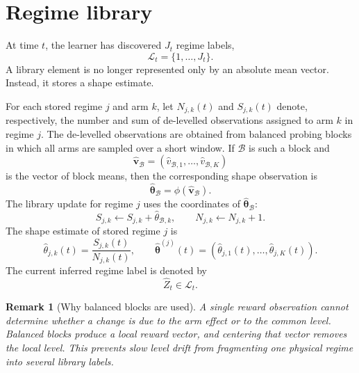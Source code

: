 \documentclass[11pt]{article}
\newtheorem{remark}{Remark}
\begin{document}
\section{Regime library}
\label{sec:regime_library}

At time $t$, the learner has discovered $J_t$ regime labels,
\begin{equation}
\label{eq:library}
\mathcal L_t=\{1,\ldots,J_t\}.
\end{equation}
A library element is no longer represented only by an absolute mean vector. Instead, it stores a shape estimate.

For each stored regime $j$ and arm $k$, let $N_{j,k}(t)$ and $S_{j,k}(t)$ denote, respectively, the number and sum of de-levelled observations assigned to arm $k$ in regime $j$. The de-levelled observations are obtained from balanced probing blocks in which all arms are sampled over a short window. If $\mathcal B$ is such a block and
\begin{equation}
\label{eq:block_vector}
\widehat{\bm v}_{\mathcal B}
=
(\widehat v_{\mathcal B,1},\ldots,\widehat v_{\mathcal B,K})
\end{equation}
is the vector of block means, then the corresponding shape observation is
\begin{equation}
\label{eq:block_shape}
\widehat{\bm\theta}_{\mathcal B}
=
\phi(\widehat{\bm v}_{\mathcal B}).
\end{equation}
The library update for regime $j$ uses the coordinates of $\widehat{\bm\theta}_{\mathcal B}$:
\begin{equation}
\label{eq:library_sum_update_shape}
S_{j,k}\leftarrow S_{j,k}+\widehat\theta_{\mathcal B,k},
\qquad
N_{j,k}\leftarrow N_{j,k}+1.
\end{equation}
The shape estimate of stored regime $j$ is
\begin{equation}
\label{eq:shape_estimate}
\widehat\theta_{j,k}(t)
=
\frac{S_{j,k}(t)}{N_{j,k}(t)},
\qquad
\widehat{\bm\theta}^{(j)}(t)
=
(\widehat\theta_{j,1}(t),\ldots,\widehat\theta_{j,K}(t)).
\end{equation}
The current inferred regime label is denoted by
\begin{equation}
\label{eq:current_regime}
\widehat Z_t\in\mathcal L_t.
\end{equation}

\begin{remark}[Why balanced blocks are used]
A single reward observation cannot determine whether a change is due to the arm effect or to the common level. Balanced blocks produce a local reward vector, and centering that vector removes the local level. This prevents slow level drift from fragmenting one physical regime into several library labels.
\end{remark}
\end{document}
